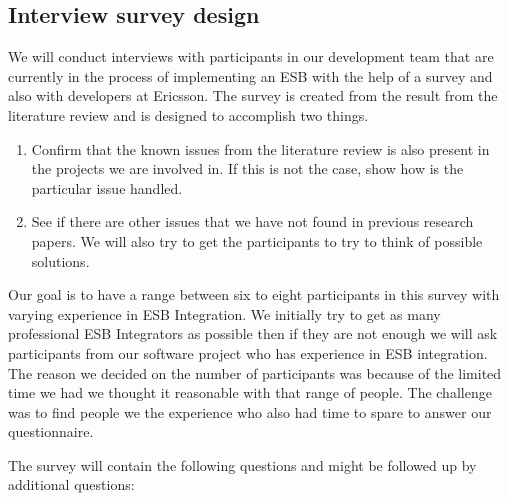 \documentclass{llncs}
\begin{document}
\subsection{Interview survey design}

We will conduct interviews with participants in our development team that are currently in the process of implementing an ESB with the help of a survey and also with developers at Ericsson. The survey is created from the result from the literature review and is designed to accomplish two things.
\begin{enumerate}
\item Confirm that the known issues from the literature review is also present in the projects we are involved in. If this is not the case, show how is the particular issue handled.
\item See if there are other issues that we have not found in previous research papers. We will also try to get the participants to try to think of possible solutions.
\end{enumerate}
Our goal is to have a range between six to eight participants in this survey with varying experience in ESB Integration. We initially try to get as many professional ESB Integrators as possible then if they are not enough we will ask participants from our software project who has experience in ESB integration. The reason we decided on the number of participants was because of the limited time we had we thought it reasonable with that range of people. The challenge was to find people we the experience who also had time to spare to answer our questionnaire. 

The survey will contain the following questions and might be followed up by additional questions:
\end{document}
